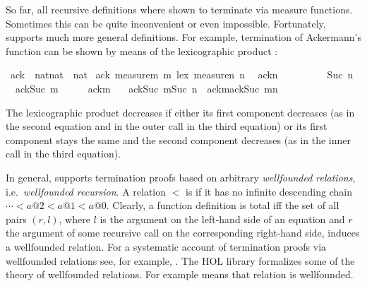 %
\begin{isabellebody}%
\def\isabellecontext{WFrec}%
%
\begin{isamarkuptext}%
\noindent
So far, all recursive definitions where shown to terminate via measure
functions. Sometimes this can be quite inconvenient or even
impossible. Fortunately,  supports much more
general definitions. For example, termination of Ackermann's function
can be shown by means of the lexicographic product :%
\end{isamarkuptext}%
\ ack\ {\isacharcolon}{\isacharcolon}\ {\isachardoublequote}nat{\isasymtimes}nat\ {\isasymRightarrow}\ nat{\isachardoublequote}\isanewline
{}\ ack\ {\isachardoublequote}measure{\isacharparenleft}{\isasymlambda}m{\isachardot}\ m{\isacharparenright}\ {\isacharless}{\isacharasterisk}lex{\isacharasterisk}{\isachargreater}\ measure{\isacharparenleft}{\isasymlambda}n{\isachardot}\ n{\isacharparenright}{\isachardoublequote}\isanewline
\ \ {\isachardoublequote}ack{\isacharparenleft}{}{\isacharcomma}n{\isacharparenright}\ \ \ \ \ \ \ \ \ {\isacharequal}\ Suc\ n{\isachardoublequote}\isanewline
\ \ {\isachardoublequote}ack{\isacharparenleft}Suc\ m{\isacharcomma}{}{\isacharparenright}\ \ \ \ \ {\isacharequal}\ ack{\isacharparenleft}m{\isacharcomma}\ {}{\isacharparenright}{\isachardoublequote}\isanewline
\ \ {\isachardoublequote}ack{\isacharparenleft}Suc\ m{\isacharcomma}Suc\ n{\isacharparenright}\ {\isacharequal}\ ack{\isacharparenleft}m{\isacharcomma}ack{\isacharparenleft}Suc\ m{\isacharcomma}n{\isacharparenright}{\isacharparenright}{\isachardoublequote}%
\begin{isamarkuptext}%
\noindent
The lexicographic product decreases if either its first component
decreases (as in the second equation and in the outer call in the
third equation) or its first component stays the same and the second
component decreases (as in the inner call in the third equation).

In general,  supports termination proofs based on
arbitrary \emph{wellfounded relations}, i.e.\ \emph{wellfounded
recursion}.  A relation $<$ is
 if it has no infinite descending chain $\cdots <
a@2 < a@1 < a@0$. Clearly, a function definition is total iff the set
of all pairs $(r,l)$, where $l$ is the argument on the left-hand side
of an equation and $r$ the argument of some recursive call on the
corresponding right-hand side, induces a wellfounded relation.  For a
systematic account of termination proofs via wellfounded relations
see, for example, \cite{Baader-Nipkow}. The HOL library formalizes
some of the theory of wellfounded relations. For example
 means that relation  is
wellfounded.


\end{isamarkuptext}
\end{isabellebody}
